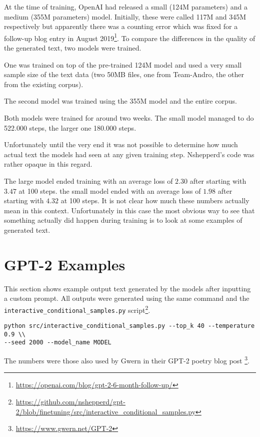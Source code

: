 \documentclass{scrartcl}
\begin{document}
At the time of training, OpenAI had released a small (124M parameters) and a medium (355M parameters) model. Initially, these were called 117M and 345M respectively but apparently there was a counting error which was fixed for a follow-up blog entry in August 2019\footnote{\url{https://openai.com/blog/gpt-2-6-month-follow-up/}}.
To compare the differences in the quality of the generated text, two models were trained.

One was trained on top of the pre-trained 124M model and used a very small sample size of the text data (two 50MB files, one from Team-Andro, the other from the existing corpus).

The second model was trained using the 355M model and the entire corpus. 

Both models were trained for around two weeks. The small model managed to do 522.000 steps, the larger one 180.000 steps.

Unfortunately until the very end it was not possible to determine how much actual text the models had seen at any given training step. Nshepperd's code was rather opaque in this regard.

The large model ended training with an average loss of $ 2.30 $ after starting with $ 3.47 $ at 100 steps.
the small model ended with an average loss of $ 1.98 $ after starting with $ 4.32 $ at 100 steps.
It is not clear how much these numbers actually mean in this context. Unfortunately in this case the most obvious way to see that something actually did happen during training is to look at some examples of generated text.

\section*{GPT-2 Examples}

This section shows example output text generated by the models after inputting a custom prompt. All outputs were generated using the same command and the \texttt{interactive\_conditional\_samples.py} script\footnote{\url{https://github.com/nshepperd/gpt-2/blob/finetuning/src/interactive_conditional_samples.py}}.

\begin{verbatim}
python src/interactive_conditional_samples.py --top_k 40 --temperature 0.9 \\
--seed 2000 --model_name MODEL
\end{verbatim}

The numbers were those also used by Gwern in their GPT-2 poetry blog post \footnote{\url{https://www.gwern.net/GPT-2}}.
\end{document}
